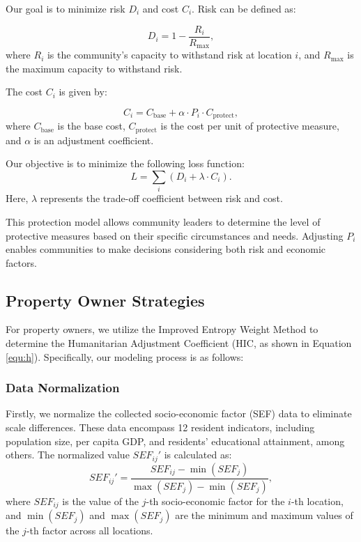 \documentclass[12pt]{article}
\begin{document}
Our goal is to minimize risk \(D_i\) and cost \(C_i\). Risk can be defined as:

\begin{equation}
D_i = 1 - \frac{R_i}{R_{\text{max}}},
\end{equation}
where \(R_i\) is the community's capacity to withstand risk at location \(i\), and \(R_{\text{max}}\) is the maximum capacity to withstand risk.

The cost \(C_i\) is given by:

\begin{equation}
C_i = C_{\text{base}} + \alpha \cdot P_i \cdot C_{\text{protect}},
\end{equation}
where \(C_{\text{base}}\) is the base cost, \(C_{\text{protect}}\) is the cost per unit of protective measure, and \(\alpha\) is an adjustment coefficient.

Our objective is to minimize the following loss function:
\begin{equation}
    L = \sum_{i} (D_i + \lambda \cdot C_i).
\end{equation}
Here, \(\lambda\) represents the trade-off coefficient between risk and cost.

This protection model allows community leaders to determine the level of protective measures based on their specific circumstances and needs. Adjusting \(P_i\) enables communities to make decisions considering both risk and economic factors.

\subsection{Property Owner Strategies}
For property owners, we utilize the Improved Entropy Weight Method to determine the Humanitarian Adjustment Coefficient (HIC, as shown in Equation \ref{equ:h}). Specifically, our modeling process is as follows:

\subsubsection{Data Normalization}
Firstly, we normalize the collected socio-economic factor (SEF) data to eliminate scale differences. These data encompass 12 resident indicators, including population size, per capita GDP, and residents' educational attainment, among others. The normalized value $ SEF_{ij}' $ is calculated as:
\begin{equation}
    SEF_{ij}' = \frac{SEF_{ij} - \min(SEF_j)}{\max(SEF_j) - \min(SEF_j)},
\end{equation}
where $ SEF_{ij} $ is the value of the $ j $-th socio-economic factor for the $ i $-th location, and $ \min(SEF_j) $ and $ \max(SEF_j) $ are the minimum and maximum values of the $ j $-th factor across all locations.
\end{document}

